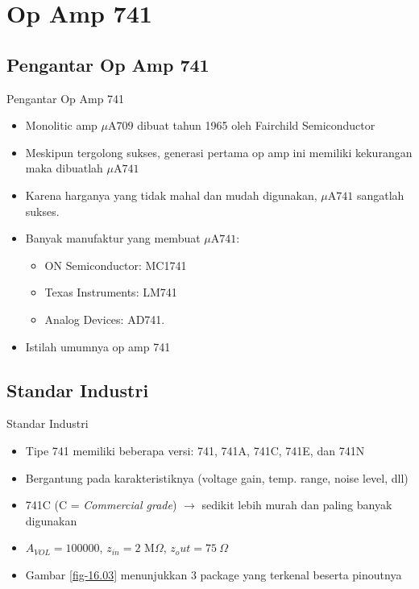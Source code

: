 \section{Op Amp 741}

\subsection{Pengantar Op Amp 741}

\begin{frame}{Pengantar Op Amp 741}
	\begin{itemize}
		\item Monolitic amp $ \mu\text{A709} $ dibuat tahun 1965 oleh Fairchild Semiconductor
		\item Meskipun tergolong sukses, generasi pertama op amp ini memiliki kekurangan maka dibuatlah $ \mu\text{A741} $
		\item Karena harganya yang tidak mahal dan mudah digunakan, $ \mu\text{A741} $ sangatlah sukses.
		\item Banyak manufaktur yang membuat $ \mu\text{A741} $:
		\begin{itemize}
			\item ON Semiconductor: MC1741
			\item Texas Instruments: LM741
			\item Analog Devices: AD741.
		\end{itemize}
		\item Istilah umumnya op amp 741
	\end{itemize}
\end{frame}

\subsection{Standar Industri}

\begin{frame}{Standar Industri}
	\begin{itemize}
		\item Tipe 741 memiliki beberapa versi: 741, 741A, 741C, 741E, dan 741N
		\item Bergantung pada karakteristiknya (voltage gain, temp. range, noise level, dll)
		\item 741C (C = \textit{Commercial grade}) $ \rightarrow $ sedikit lebih murah dan paling banyak digunakan
		\item $ A_{VOL} = 100000 $, $ z_{in} = 2 \text{ M}\Omega $, $ z_out = 75~\Omega $
		\item Gambar \ref{fig-16.03} menunjukkan 3 package yang terkenal beserta pinoutnya
	\end{itemize}
\end{frame}

